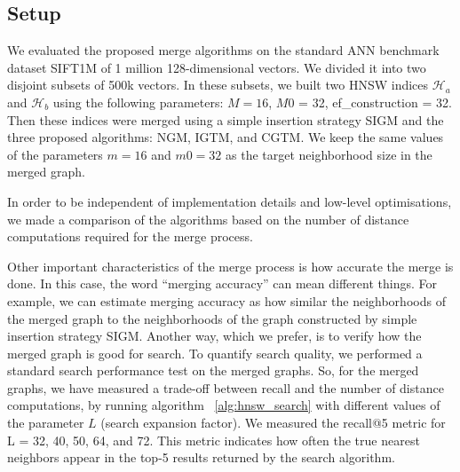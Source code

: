 \documentclass{article}
\begin{document}


\subsection{Setup}

We evaluated the proposed merge algorithms on the standard ANN benchmark dataset SIFT1M of 1 million 128-dimensional vectors. We divided it into two disjoint subsets of 500k vectors. In these subsets, we built two HNSW indices $\mathcal{H}_a$ and $\mathcal{H}_b$ using the following parameters: $M = 16$, $M0$ = 32, ef\_construction = 32.
Then these indices were merged using a simple insertion strategy \textsc{SIGM} and the three proposed algorithms: \textsc{NGM}, \textsc{IGTM}, and \textsc{CGTM}. We keep the same values of the parameters $m = 16$ and $m0 = 32$ as the target neighborhood size in the merged graph.

In order to be independent of implementation details and low-level optimisations, we made a comparison of the algorithms based on the number of distance computations required for the merge process.

Other important characteristics of the merge process is how accurate the merge is done. In this case, the word ``merging accuracy'' can mean different things. For example, we can estimate merging accuracy as how similar the neighborhoods of the merged graph to the neighborhoods of the graph constructed by simple insertion strategy \textsc{SIGM}. 
Another way, which we prefer, is to verify how the merged graph is good for search. To quantify search quality, we performed a standard search performance test on the merged graphs. So, for the merged graphs, we have measured a trade-off between recall and the number of distance computations, by running algorithm ~\ref{alg:hnsw_search} with different values of the parameter $L$ (search expansion factor). We measured the recall@5 metric for L = 32, 40, 50, 64, and 72. This metric indicates how often the true nearest neighbors appear in the top-5 results returned by the search algorithm.
\end{document}
